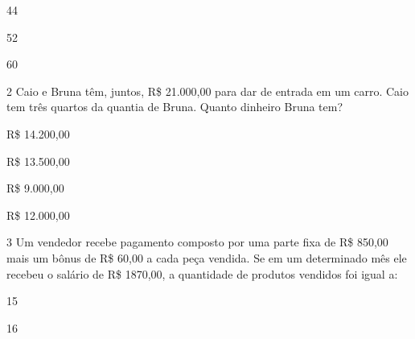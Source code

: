 \begin{escolha}
\begin{boxmedio}
\begin{boxmedio}
{\begin{boxpeq}
\begin{boxpeq}
{\begin{boxpeq}
\begin{boxmedio}
\begin{boxmedio}
\begin{boxpeq}
\begin{boxmedio}
\begin{boxpeq}
\begin{boxpeq}
\begin{boxpeq}
\begin{boxpeq}
\begin{boxmedio}
{\begin{boxmedio}
\begin{boxmedio}
\begin{boxpeq}
\begin{boxmedio}
\begin{boxpeq}
\begin{boxpeq}
\begin{boxpeq}
\begin{escolha}
{\begin{boxmedio}
\begin{boxpeq}
\begin{boxpeq}
\begin{boxpeq}
\begin{boxpeq}
\begin{escolha}
  \item 44

  \item 52

  \item 60

\end{escolha}


\num{2} Caio e Bruna têm, juntos, R\$ 21.000,00 para dar de entrada em um
carro. Caio tem três quartos da quantia de Bruna. Quanto dinheiro Bruna tem?

\begin{escolha}
  \item R\$ 14.200,00

  \item R\$ 13.500,00

  \item R\$ 9.000,00

  \item R\$ 12.000,00
\end{escolha}


\num{3} Um vendedor recebe pagamento composto por uma parte fixa de R\$
850,00 mais um bônus de R\$ 60,00 a cada peça vendida. Se em um
determinado mês ele recebeu o salário de R\$ 1870,00, a
quantidade de produtos vendidos foi igual a:

\begin{escolha}
  \item 15

  \item 16


\end{escolha}
\end{boxpeq}
\end{boxpeq}
\end{boxpeq}
\end{boxpeq}
\end{boxmedio}}
\end{escolha}
\end{boxpeq}
\end{boxpeq}
\end{boxpeq}
\end{boxmedio}
\end{boxpeq}
\end{boxmedio}
\end{boxmedio}}
\end{boxmedio}
\end{boxpeq}
\end{boxpeq}
\end{boxpeq}
\end{boxpeq}
\end{boxmedio}
\end{boxpeq}
\end{boxmedio}
\end{boxmedio}
\end{boxpeq}}
\end{boxpeq}
\end{boxpeq}}
\end{boxmedio}
\end{boxmedio}
\end{escolha}
